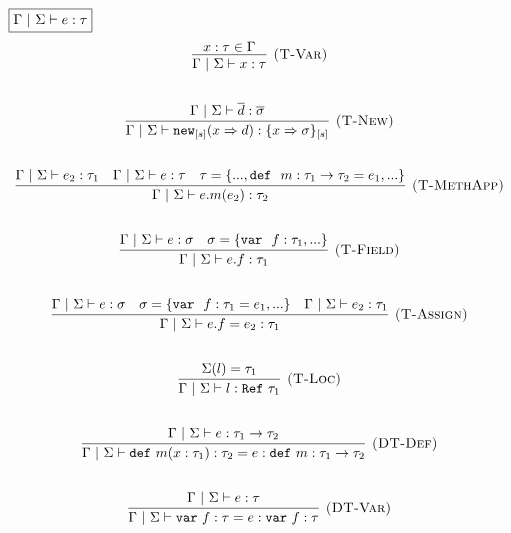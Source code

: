\documentclass{llncs}
\newcommand{\keywadj}[1]{\mathtt{#1}}
\newcommand{\keyw}[1]{\keywadj{#1}~}
\newcommand{\Reftt}{\mathtt{Ref}~}
\begin{document}
$\fbox{$\Gamma~|~\Sigma \vdash e : \tau$}$
\[
\begin{array}{c}
\infer[\textsc{(T-Var)}]
  {\Gamma~|~\Sigma \vdash x : \tau}
  {x : \tau \in \Gamma}\\[5ex]

\infer[\textsc{(T-New)}]
	{\Gamma~|~\Sigma \vdash\keywadj{new}_{[s]}(x \Rightarrow d) : \{ x \Rightarrow \sigma \}_{[s]}}
	{\Gamma~|~\Sigma \vdash \overline{d} : \overline{\sigma}} \\[5ex]

\infer[\textsc{(T-MethApp)}]
	{\Gamma~|~\Sigma \vdash  e.m(e_2) : \tau_2} 
	{\Gamma~|~\Sigma \vdash e_2 : \tau_1 & \Gamma~|~\Sigma \vdash e : \tau & \tau=\{..., \keyw{def}~ m : \tau_1 \rightarrow \tau_2 = e_1, ... \} }\\[5ex]

%

\infer[\textsc{(T-Field)}]
	{\Gamma~|~\Sigma \vdash  e.f : \tau_1} 
	{\Gamma~|~\Sigma \vdash e:\sigma & \sigma= \{\keyw{var}~ f : \tau_1,... \} }\\[5ex]

\infer[\textsc{(T-Assign)}]
	{\Gamma~|~\Sigma \vdash  e.f=e_2 : \tau_1} 
	{\Gamma~|~\Sigma \vdash e : \sigma & \sigma= \{\keyw{var}~ f:\tau_1=e_1,... \} & \Gamma~|~\Sigma \vdash e_2 : \tau_1 }\\[5ex]

\infer[\textsc{(T-Loc)}]
  {\Gamma~|~\Sigma \vdash l : \Reftt \tau_1}
  {\Sigma(l) = \tau_1}\\[5ex]

\infer[\textsc{(DT-Def)}]
  {\Gamma~|~\Sigma \vdash \keyw{def} m(x : \tau_1) : \tau_2 = e : \keyw{def} m : \tau_1 \rightarrow \tau_2}
  {\Gamma~|~\Sigma \vdash e : \tau_1 \rightarrow \tau_2}\\[5ex]

\infer[\textsc{(DT-Var)}]
  {\Gamma~|~\Sigma \vdash \keyw{var} f : \tau = e : \keyw{var} f : \tau}
  {\Gamma~|~\Sigma \vdash e : \tau}\\[5ex]

%

\end{array}
\]
\end{document}
